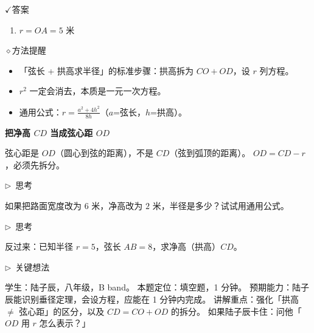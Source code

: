 \documentclass{exam-zh}
\newcommand{\edukai}{\kaishu}
\newcommand{\eduSubTitle}[1]{%
  \needspace{4\baselineskip}%
  \vspace{1mm}
  {\color{edu-blue}\bfseries #1}\par
  \vspace{1mm}
}
\newenvironment{eduAuxItem}[1]{%
  \needspace{4\baselineskip}%
  \vspace{2mm}
  \par\noindent
  \hangindent=8mm\hangafter=1
  {\color{edu-blue}\edukai $\triangleright$~#1}\enspace
  \begingroup
  \color{edu-ink}
  \edukai
}{%
  \endgroup
  \par
  \vspace{4mm}
}
\newcommand{\eduIconCheck}{\(\checkmark\)}
\newcommand{\eduIconPin}{\(\diamond\)}
\newenvironment{eduBulletList}{%
  \begin{itemize}[
    label=\textbullet,
    leftmargin=5mm,
    itemsep=1.2mm,
    topsep=0pt,
    parsep=0pt
  ]
}{%
  \end{itemize}
}
\newenvironment{eduBottomGrid}{%
  \vspace{1mm}
  \par\noindent
}{%
  \par\vspace{1mm}
}
\newenvironment{eduSummaryLeft}{%
  \begin{minipage}[t]{0.30\linewidth}
}{%
  \end{minipage}
}
\newcommand{\eduSummaryDivider}{%
  \hspace{4mm}{\color{edu-line}\vrule width 0.35pt}\hspace{7mm}%
}
\newenvironment{eduSummaryRight}{%
  \begin{minipage}[t]{0.58\linewidth}
}{%
  \end{minipage}
}
\newenvironment{eduPlainList}{%
  \begin{enumerate}[
    label=(\arabic*),
    leftmargin=7mm,
    itemsep=1.2mm,
    topsep=0pt,
    parsep=0pt
  ]
}{%
  \end{enumerate}
}
\begin{document}
\begin{eduBottomGrid}
  \begin{eduSummaryLeft}
    \begin{eduSummaryBlock}{\eduIconCheck}{答案}
    \begin{eduPlainList}
      \item $r = OA = 5$ 米    \end{eduPlainList}
    \end{eduSummaryBlock}
  \end{eduSummaryLeft}
  \eduSummaryDivider
  \begin{eduSummaryRight}
    \begin{eduSummaryBlock}{\eduIconPin}{方法提醒}
    \begin{eduBulletList}
      \item 「弦长 + 拱高求半径」的标准步骤：拱高拆为 $CO+OD$，设 $r$ 列方程。      \item $r^2$ 一定会消去，本质是一元一次方程。      \item 通用公式：$r = \frac{a^2 + 4h^2}{8h}$（$a$=弦长，$h$=拱高）。    \end{eduBulletList}
    \end{eduSummaryBlock}
  \end{eduSummaryRight}
\end{eduBottomGrid}




\begin{eduMistakeBox}
\eduSubTitle{把净高 $CD$ 当成弦心距 $OD$}弦心距是 $OD$（圆心到弦的距离），不是 $CD$（弦到弧顶的距离）。
$OD = CD - r$，必须先拆分。
\end{eduMistakeBox}




\begin{eduAuxItem}{思考}
如果把路面宽度改为 $6$ 米，净高改为 $2$ 米，半径是多少？试试用通用公式。\end{eduAuxItem}




\begin{eduAuxItem}{思考}
反过来：已知半径 $r=5$，弦长 $AB=8$，求净高（拱高）$CD$。\end{eduAuxItem}



\clearpage

\begin{eduAuxItem}{关键想法}
学生：陆子辰，八年级，B band。
本题定位：填空题，1 分钟。
预期能力：陆子辰能识别垂径定理，会设方程，应能在 1 分钟内完成。
讲解重点：强化「拱高 $\neq$ 弦心距」的区分，以及 $CD = CO + OD$ 的拆分。
如果陆子辰卡住：问他「$OD$ 用 $r$ 怎么表示？」
\end{eduAuxItem}
\end{document}
